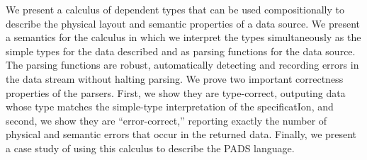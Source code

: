   We present a calculus of dependent types that can be used
  compositionally to describe the physical layout and semantic
  properties of a data source. We present a semantics for the calculus
  in which we interpret the types simultaneously as the simple types
  for the data described and as parsing functions for the data source.
  The parsing functions are robust, automatically detecting and
  recording errors in the data stream without halting parsing.  We
  prove two important correctness properties of the parsers.  First,
  we show they are type-correct, outputing data whose type matches the
  simple-type interpretation of the specificatIon, and second, we show
  they are ``error-correct,'' reporting exactly the number of physical
  and semantic errors that occur in the returned data. Finally, we
  present a case study of using this calculus to describe the PADS
  language.
